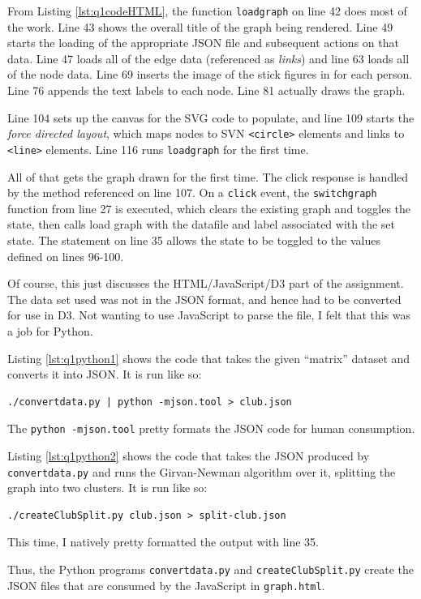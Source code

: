 \documentclass[letterpaper,11pt]{article}
\begin{document}
From Listing \ref{lst:q1codeHTML}, the function \verb+loadgraph+ on line 42 does most of the work.  Line 43 shows the overall title of the graph being rendered.  Line 49 starts the loading of the appropriate JSON file and subsequent actions on that data.  Line 47 loads all of the edge data (referenced as \emph{links}) and line 63 loads all of the node data.  Line 69 inserts the image of the stick figures in for each person.  Line 76 appends the text labels to each node.  Line 81 actually draws the graph.

Line 104 sets up the canvas for the SVG code to populate, and line 109 starts the \emph{force directed layout}, which maps nodes to SVN \verb+<circle>+ elements and links to \verb+<line>+ elements.  Line 116 runs \verb+loadgraph+ for the first time.

All of that gets the graph drawn for the first time.  The click response is handled by the method referenced on line 107.  On a \verb+click+ event, the \verb+switchgraph+ function from line 27 is executed, which clears the existing graph and toggles the state, then calls load graph with the datafile and label associated with the set state.  The statement on line 35 allows the state to be toggled to the values defined on lines 96-100.

Of course, this just discusses the HTML/JavaScript/D3 part of the assignment.  The data set used was not in the JSON format, and hence had to be converted for use in D3.  Not wanting to use JavaScript to parse the file, I felt that this was a job for Python.

Listing \ref{lst:q1python1} shows the code that takes the given ``matrix'' dataset and converts it into JSON.  It is run like so:
\begin{lstlisting}[frame=single]
./convertdata.py | python -mjson.tool > club.json
\end{lstlisting}
The \verb+python -mjson.tool+ pretty formats the JSON code for human consumption.

Listing \ref{lst:q1python2} shows the code that takes the JSON produced by \verb+convertdata.py+ and runs the Girvan-Newman algorithm over it, splitting the graph into two clusters.  It is run like so:
\begin{lstlisting}[frame=single]
./createClubSplit.py club.json > split-club.json
\end{lstlisting}
This time, I natively pretty formatted the output with line 35.

Thus, the Python programs \verb+convertdata.py+ and \verb+createClubSplit.py+ create the JSON files that are consumed by the JavaScript in \verb+graph.html+.
\end{document}
